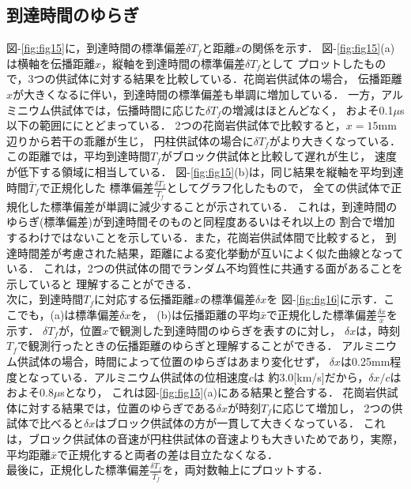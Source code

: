 \subsection{到達時間のゆらぎ}
図-\ref{fig:fig15}に，到達時間の標準偏差$\delta T_f$と距離$x$の関係を示す．
図-\ref{fig:fig15}(a)は横軸を伝播距離$x$，縦軸を到達時間の標準偏差$\delta T_f$として
プロットしたもので，3つの供試体に対する結果を比較している．花崗岩供試体の場合，
伝播距離$x$が大きくなるに伴い，到達時間の標準偏差も単調に増加している．
一方，アルミニウム供試体では，伝播時間に応じた$\delta T_f$の増減はほとんどなく，
およそ0.1$\mu$s以下の範囲ににとどまっている．
2つの花崗岩供試体で比較すると，$x=15$mm辺りから若干の乖離が生じ，
円柱供試体の場合に$\delta T_f$がより大きくなっている．
この距離では，平均到達時間$T_f$がブロック供試体と比較して遅れが生じ，
速度が低下する領域に相当している．
図-\ref{fig:fig15}(b)は，同じ結果を縦軸を平均到達時間$\bar T_f$で正規化した
標準偏差$\frac{\delta T_f}{\bar{T}_f}$としてグラフ化したもので，
全ての供試体で正規化した標準偏差が単調に減少することが示されている．
これは，到達時間のゆらぎ(標準偏差)が到達時間そのものと同程度あるいはそれ以上の
割合で増加するわけではないことを示している．また，花崗岩供試体間で比較すると，
到達時間差が考慮された結果，距離による変化挙動が互いによく似た曲線となっている．
これは，2つの供試体の間でランダム不均質性に共通する面があることを示していると
理解することができる．\\
\hspace{\parindent}
次に，到達時間$T_f$に対応する伝播距離$x$の標準偏差$\delta x$を
図-\ref{fig:fig16}に示す．ここでも，(a)は標準偏差$\delta x$を，
(b)は伝播距離の平均$\bar{x}$で正規化した標準偏差$\frac{\delta x}{\bar{x}}$を示す．
$\delta T_f$が，位置$x$で観測した到達時間のゆらぎを表すのに対し，
$\delta x$は，時刻$T_f$で観測行ったときの伝播距離のゆらぎと理解することができる．
アルミニウム供試体の場合，時間によって位置のゆらぎはあまり変化せず，
$\delta x$は0.25mm程度となっている．アルミニウム供試体の位相速度$c$は
約3.0[km/s]だから，$\delta x/c$はおよそ$0.8\mu$sとなり，
これは図-\ref{fig:fig15}(a)にある結果と整合する．
花崗岩供試体に対する結果では，位置のゆらぎである$\delta x$が時刻$T_f$に応じて増加し，
2つの供試体で比べると$\delta x$はブロック供試体の方が一貫して大きくなっている．
これは，ブロック供試体の音速が円柱供試体の音速よりも大きいためであり，実際，
平均距離$\bar{x}$で正規化すると両者の差は目立たなくなる．\\
\hspace{\parindent}
最後に，正規化した標準偏差$\frac{\delta T_f}{\bar{T}_f}$を，両対数軸上にプロットする．
